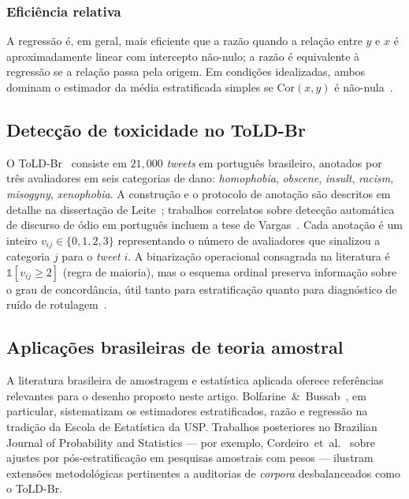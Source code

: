 \subsubsection{Eficiência relativa}

A regressão é, em geral, mais eficiente que a razão quando a relação entre $y$
e $x$ é aproximadamente linear com intercepto não-nulo; a razão é equivalente
à regressão se a relação passa pela origem. Em condições idealizadas, ambos
dominam o estimador da média estratificada simples se $\mathrm{Cor}(x,y)$ é
não-nula~\cite{cochran1977,thompson2002}.

\subsection{Detecção de toxicidade no ToLD-Br}
\label{sec:theory:toldbr}

O ToLD-Br~\cite{leite2020,leite2020_thesis} consiste em $21{,}000$
\textit{tweets} em português brasileiro, anotados por três avaliadores em
seis categorias de dano: \textit{homophobia}, \textit{obscene},
\textit{insult}, \textit{racism}, \textit{misogyny}, \textit{xenophobia}.
A construção e o protocolo de anotação são descritos em detalhe na
dissertação de Leite~\cite{leite2020_thesis}; trabalhos correlatos sobre
detecção automática de discurso de ódio em português incluem a tese de
Vargas~\cite{vargas2022_thesis}. Cada anotação é um inteiro
$v_{ij} \in \{0,1,2,3\}$ representando o número de avaliadores que sinalizou
a categoria $j$ para o \textit{tweet} $i$. A binarização operacional
consagrada na literatura é $\mathbb{1}[v_{ij} \geq 2]$ (regra de maioria), mas
o esquema ordinal preserva informação sobre o grau de concordância, útil
tanto para estratificação quanto para diagnóstico de ruído de
rotulagem~\cite{leite2020,leite2020_thesis}.

\subsection{Aplicações brasileiras de teoria amostral}
\label{sec:theory:brasil}

A literatura brasileira de amostragem e estatística aplicada
oferece referências relevantes para o desenho proposto neste artigo.
Bolfarine~\&~Bussab~\cite{bolfarine2005}, em particular, sistematizam os
estimadores estratificados, razão e regressão na tradição da Escola de
Estatística da USP. Trabalhos posteriores no Brazilian Journal of Probability
and Statistics --- por exemplo, Cordeiro~et~al.~\cite{cordeiro2010} sobre
ajustes por pós-estratificação em pesquisas amostrais com pesos --- ilustram
extensões metodológicas pertinentes a auditorias de \textit{corpora}
desbalanceados como o ToLD-Br.
